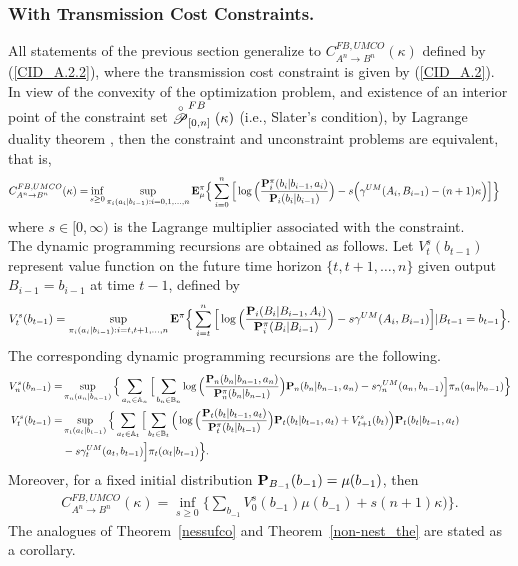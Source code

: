 \documentclass[11pt, a4paper, journal,onecolumn]{IEEEtran}
\newcommand{\mb}{\mathbb}
\newcommand{\sr}{\stackrel}
\newcommand{\rar}{\rightarrow}
\newcommand{\bea}{\begin{eqnarray}}
\newcommand{\eea}{\end{eqnarray}}
\begin{document}
\subsubsection{With Transmission Cost Constraints.}
All statements of the previous section generalize to $C_{A^n \rar B^n}^{FB,UMCO}(\kappa)$ defined by  (\ref{CID_A.2.2}), where the transmission cost constraint is given by (\ref{CID_A.2}). In view of the convexity of the optimization problem, and  existence of an interior point of the constraint set $\sr{\circ}{ {\cal P}}_{[0,n]}^{FB}(\kappa)$ (i.e., Slater's condition), by Lagrange duality theorem \cite{luenberger1968optimization}, then the constraint and unconstraint problems are equivalent, that is, 
\begin{align}
C_{A^n \rar B^n}^{FB,UMCO}(\kappa) =& \inf_{s \geq 0}  \sup_{ \pi_i(a_i|b_{i-1}): i=0,1,  \ldots, n } {\bf E}^\pi_{\mu} \Big\{ \sum_{i=0}^n \Big[ \log \Big(   \frac{{\bf P}_i^\pi(b_i|b_{i-1}, a_i)}{{\bf P}_i(b_i|b_{i-1})}\Big) -s \Big(\gamma^{UM}(A_i, B_{i-1})-(n+1)\kappa\Big)\Big]\Big\}
  \label{CID_TC_1}
\end{align}
where $s\in [0, \infty)$ is the Lagrange multiplier associated with the constraint. \\
The dynamic programming recursions are obtained as follows. Let $V_t^s(b_{t-1})$ represent value function  on the future time horizon $\{t,t+1,\dots,n\}$ given output $B_{i-1}=b_{i-1}$ at time $t-1$, defined by
\begin{align}
V_t^s(b_{t-1})=\sup_{\pi_i(a_i|b_{i-1}):i=t,t+1,\dots,n}{\bf E}^\pi\Big\{\sum_{i=t}^{n}\Big[\log\Big(\frac{{\bf P}_i(B_i|B_{i-1},A_i)}{{\bf P}_i^\pi(B_i|B_{i-1})}\Big)-s \gamma^{UM}(A_i, B_{i-1})\Big] |B_{t-1}=b_{t-1}\Big\}. \label{dyn_TC}
\end{align}
The corresponding dynamic programming recursions are the following.  
\begin{align}
V_n^s(b_{n-1})=&\sup_{\pi_n(a_n|b_{n-1})}\Big\{\sum_{a_n \in {\mb A}_n}\Big[ \sum_{b_n \in {\mb B}_n}\log\Big(\frac{{\bf P}_n(b_n|b_{n-1},a_n)}{{\bf P}_n^\pi(b_n|b_{n-1})}\Big){\bf P}_n(b_n|b_{n-1},a_n)-s\gamma_n^{UM}(a_n,b_{n-1})\Big]\pi_n(a_n|b_{n-1})\Big\}\label{DP.eq.3a_TC}\\
V_t^s(b_{t-1})=&\sup_{\pi_t(a_t|b_{t-1})}\Big\{\sum_{a_t \in {\mb A}_t}\Big[\sum_{b_t \in {\mb B}_t}\Big(\log\Big(\frac{{\bf P}_t(b_t|b_{t-1},a_t)}{{\bf P}_t^\pi(b_t|b_{t-1})}\Big){\bf P}_t(b_t|b_{t-1},a_t) +V_{t+1}^s(b_{t})\Big){\bf P}_t(b_t|b_{t-1},a_t)\nonumber \\
&-s\gamma_t^{UM}(a_t,b_{t-1})\Big]   \pi_t(\alpha_t|b_{t-1})\Big\}. \label{DP.eq.3b_TC}
\end{align}
Moreover, for a fixed initial distribution ${\bf P}_{B_{-1}}(b_{-1})=\mu(b_{-1})$, then
\bea 
C_{A^n \rar B^n}^{FB,UMCO}(\kappa)=\inf_{s\geq 0}\Big\{ \sum_{b_{-1}} V_0^s(b_{-1})\mu(b_{-1})+ s(n+1)\kappa)\Big\}.
\eea
The analogues of Theorem~\ref{nessufco} and Theorem~\ref{non-nest_the} are  stated as a corollary. \\
\end{document}
